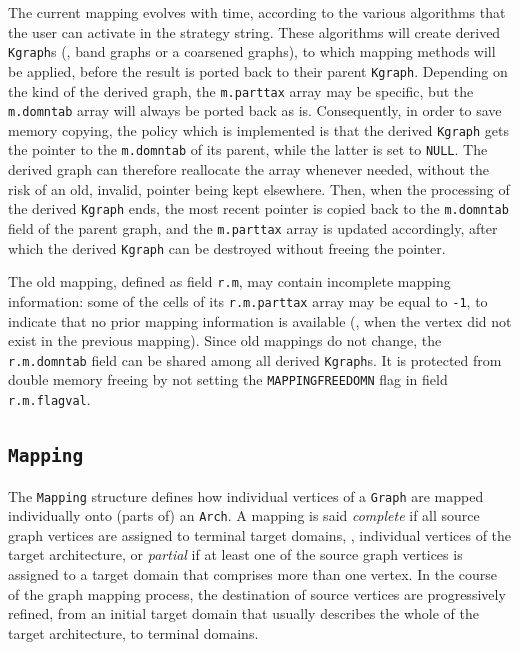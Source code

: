 The current mapping evolves with time, according to the various
algorithms that the user can activate in the strategy string. These
algorithms will create derived \texttt{Kgraph}s (\eg, band graphs or a
coarsened graphs), to which mapping methods will be applied, before
the result is ported back to their parent \texttt{Kgraph}. Depending
on the kind of the derived graph, the \texttt{m.parttax} array may be
specific, but the \texttt{m.domntab} array will always be ported back
as is. Consequently, in order to save memory copying, the policy which
is implemented is that the derived \texttt{Kgraph} gets the pointer to
the \texttt{m.domntab} of its parent, while the latter is set to
\texttt{NULL}. The derived graph can therefore reallocate the array
whenever needed, without the risk of an old, invalid, pointer being
kept elsewhere. Then, when the processing of the derived
\texttt{Kgraph} ends, the most recent pointer is copied back to the
\texttt{m.domntab} field of the parent graph, and the
\texttt{m.parttax} array is updated accordingly, after which the
derived \texttt{Kgraph} can be destroyed without freeing the
pointer.

The old mapping, defined as field \texttt{r.m},
may contain incomplete mapping information: some of the cells of its
\texttt{r.m.parttax} array may be equal to \texttt{-1}, to indicate
that no prior mapping information is available (\eg, when the vertex
did not exist in the previous mapping). Since old mappings do not
change, the \texttt{r.m.domntab} field can be shared among all derived
\texttt{Kgraph}s. It is protected from double memory freeing by not
setting the \texttt{MAPPING\lbt FREE\lbt DOMN} flag in field
\texttt{r.m.flagval}.

\subsection{\texttt{Mapping}}
\label{sec-data-mapping}

The \texttt{Mapping} structure defines how individual vertices of a
\texttt{Graph} are mapped individually onto (parts of) an
\texttt{Arch}. A mapping is said \textit{complete} if all source graph
vertices are assigned to terminal target domains, \ie, individual
vertices of the target architecture, or \textit{partial} if at least
one of the source graph vertices is assigned to a target domain that
comprises more than one vertex. In the course of the graph mapping
process, the destination of source vertices are progressively refined,
from an initial target domain that usually describes the whole of the
target architecture, to terminal domains.

